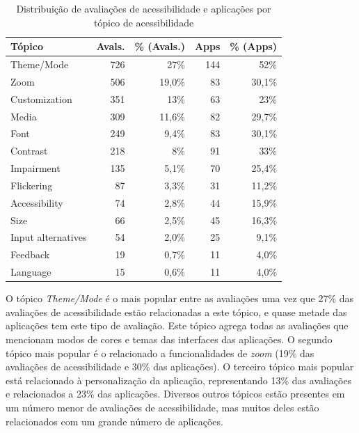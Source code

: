 \begin{table}[]
\centering
\caption{Distribuição de avaliações de acessibilidade e aplicações por tópico de acessibilidade}
\label{tab:group-keywords}
\begin{tabular}{lrrrr}
\hline
Tópico        & Avals.  & \% (Avals.) & Apps & \% (Apps) \\
\hline
Theme/Mode    & 726     & 27\%        & 144  & 52\%  \\
Zoom          & 506     & 19,0\%      & 83   & 30,1\%  \\
Customization & 351     & 13\%        & 63   & 23\%  \\
Media         & 309     & 11,6\%      & 82   & 29,7\%  \\
Font          & 249     & 9,4\%       & 83   & 30,1\%  \\
Contrast      & 218     & 8\%         & 91  & 33\%  \\
Impairment    & 135     & 5,1\%       & 70   & 25,4\%  \\
Flickering    & 87      & 3,3\%       & 31   & 11,2\%  \\
Accessibility & 74      & 2,8\%       & 44   & 15,9\%  \\
Size          & 66      & 2,5\%       & 45   & 16,3\%  \\
Input alternatives        & 54       & 2,0\%      & 25   & 9,1\%   \\
Feedback      & 19      & 0,7\%      & 11   & 4,0\%   \\
Language      & 15      & 0,6\%      & 11   & 4,0\%  \\
\hline
\end{tabular}
\end{table}

O tópico \textit{Theme/Mode} é o mais popular entre as avaliações uma vez que 27\% das avaliações de acessibilidade estão relacionadas a este tópico, e quase metade das aplicações tem este tipo de avaliação. 
Este tópico agrega todas as avaliações que mencionam modos de cores e temas das interfaces das aplicações. 
O segundo tópico mais popular é o relacionado a funcionalidades de \textit{zoom} (19\% das avaliações de acessibilidade e 30\% das aplicações).
O terceiro tópico mais popular está relacionado à personalização da aplicação, representando 13\% das avaliações e relacionados a 23\% das aplicações. 
Diversos outros tópicos estão presentes em um número menor de avaliações de acessibilidade, mas muitos deles estão relacionados com um grande número de aplicações. 

